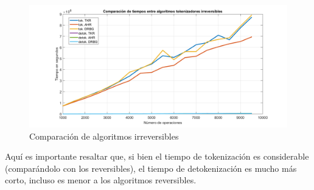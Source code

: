 \begin{figure}[H]
  \begin{center}
    \includegraphics[width=1\linewidth]{estaticos/imagenes/todo_irrev.png}
    \caption{Comparación de algoritmos irreversibles}
  \end{center}
\end{figure}

Aquí es importante resaltar que, si bien el tiempo de tokenización es
considerable (comparándolo con los reversibles), el tiempo de
detokenización es mucho más corto, incluso es menor a los algoritmos
reversibles.
